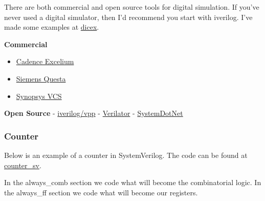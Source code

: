 There are both commercial and open source tools for digital simulation.
If you've never used a digital simulator, then I'd recommend you start
with iverilog. I've made some examples at
\href{https://github.com/wulffern/dicex/tree/main/project/verilog}{dicex}.

\textbf{Commercial}

\begin{itemize}
\tightlist
\item
  \href{https://www.cadence.com/ko_KR/home/tools/system-design-and-verification/simulation-and-testbench-verification/xcelium-simulator.html}{Cadence
  Excelium}
\item
  \href{https://eda.sw.siemens.com/en-US/ic/questa/simulation/advanced-simulator/}{Siemens
  Questa}
\item
  \href{https://www.synopsys.com/verification/simulation/vcs.html}{Synopsys
  VCS}
\end{itemize}

\textbf{Open Source} -
\href{https://github.com/steveicarus/iverilog}{iverilog/vpp} -
\href{https://www.veripool.org/verilator/}{Verilator} -
\href{https://sourceforge.net/projects/systemdotnet/}{SystemDotNet}

\subsubsection{Counter}\label{counter}

Below is an example of a counter in SystemVerilog. The code can be found
at
\href{https://github.com/wulffern/dicex/tree/main/sim/verilog/counter_sv}{counter\_sv}.

In the always\_comb section we code what will become the combinatorial
logic. In the always\_ff section we code what will become our registers.

